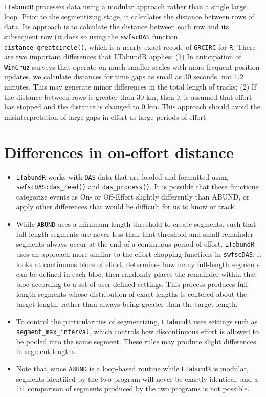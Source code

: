\documentclass[
]{book}
\begin{document}
\begin{itemize}
  \texttt{LTabundR} processes data using a modular approach rather than a single large loop. Prior to the segmentizing stage, it calculates the distance between rows of data. Its approach is to calculate the distance between each row and its subsequent row (it does so using the \texttt{swfscDAS} function \texttt{distance\_greatcircle()}, which is a nearly-exact recode of \texttt{GRCIRC} for \texttt{R}. There are two important differences that LTabundR applies: (1) In anticipation of \texttt{WinCruz} surveys that operate on much smaller scales with more frequent position updates, we calculate distances for time gaps as small as 30 seconds, not 1.2 minutes. This may generate minor differences in the total length of tracks; (2) If the distance between rows is greater than 30 km, then it is assumed that effort has stopped and the distance is changed to 0 km. This approach should avoid the misinterpretation of large gaps in effort as large periods of effort.
\end{itemize}

\hypertarget{differences-in-on-effort-distance}{%
\section*{Differences in on-effort distance}\label{differences-in-on-effort-distance}}

\begin{itemize}
\item
  \texttt{LTabundR} works with \texttt{DAS} data that are loaded and formatted using \texttt{swfscDAS:das\_read()} and \texttt{das\_process()}. It is possible that these functions categorize events as On- or Off-Effort slightly differently than ABUND, or apply other differences that would be difficult for us to know or track.
\item
  While \texttt{ABUND} uses a minimum length threshold to create segments, such that full-length segments are never less than that threshold and small remainder segments always occur at the end of a continuous period of effort, \texttt{LTabundR} uses an approach more similar to the effort-chopping functions in \texttt{swfscDAS}: it looks at continuous blocs of effort, determines how many full-length segments can be defined in each bloc, then randomly places the remainder within that bloc according to a set of user-defined settings. This process produces full-length segments whose distribution of exact lengths is centered about the target length, rather than always being greater than the target length.
\item
  To control the particularities of segmentizing, \texttt{LTabundR} uses settings such as \texttt{segment\_max\_interval}, which controls how discontinuous effort is allowed to be pooled into the same segment. These rules may produce slight differences in segment lengths.
\item
  Note that, since \texttt{ABUND} is a loop-based routine while \texttt{LTabundR} is modular, segments identified by the two program will never be exactly identical, and a 1:1 comparison of segments produced by the two programs is not possible.
\end{itemize}
\end{document}
